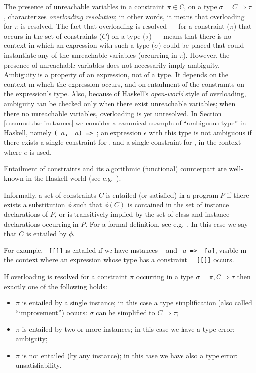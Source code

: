 The presence of unreachable variables in a constraint $\pi\in C$, on a
type $\sigma = C \Rightarrow \tau$, characterizes {\em overloading
  resolution\/}; in other words, it means that overloading for $\pi$
is resolved. The fact that overloading is resolved --- for a
constraint ($\pi$) that occurs in the set of constraints ($C$) on a
type ($\sigma$) --- means that there is no context in which an
expression with such a type ($\sigma$) could be placed that could
instantiate any of the unreachable variables (occurring in
$\pi$). However, the presence of unreachable variables does not
necessarily imply ambiguity. Ambiguity is a property of an expression,
not of a type. It depends on the context in which the expression
occurs, and on entailment of the constraints on the expression's type.
Also, because of Haskell's {\em open-world\/} style of overloading,
ambiguity can be checked only when there exist unreachable variables;
when there no unreachable variables, overloading is yet unresolved.
In Section \ref{sec:modular-instances} we consider a canonical example
of ``ambiguous type'' in Haskell, namely {\tt (\SShow\ $a$,
  \RRead\ $a$) => \String}; an expression $e$ with this type is not
ambiguous if there exists a single constraint for \SShow, and a single
constraint for \RRead, in the context where $e$ is used.

Entailment of constraints and its algorithmic (functional) counterpart
are well-known in the Haskell world (see
e.g.~\cite{MarkJones94a,TheoryOfOverloading,JBCS-Ambiguity-and-constrained-polymorphism}).

Informally, a set of constraints $C$ is entailed (or satisfied) in a
program $P$ if there exists a substitution $\phi$ such that $\phi(C)$
is contained in the set of instance declarations of $P$, or is
transitively implied by the set of class and instance declarations
occurring in $P$. For a formal definition, see
e.g.~\cite{MarkJones94a,JBCS-Ambiguity-and-constrained-polymorphism}. In
this case we say that $C$ is entailed by $\phi$.

For example, {\tt \Eq\ [[\Integer]]} is entailed if we have instances
{\tt \Eq\ \Integer} and {\tt \Eq\ $a$ => \Eq\ [$a$]}, visible in the
context where an expression whose type has a constraint {\tt
  \Eq\ [[\Integer]]} occurs.

If overloading is resolved for a constraint $\pi$ occurring in a type
$\sigma = \pi,C \Rightarrow \tau$ then exactly one of the following
holds:
\begin{itemize}

\item $\pi$ is entailed by a single instance; in this case a type
  simplification (also called ``improvement'') occurs: $\sigma$ can be
  simplified to $C \Rightarrow \tau$;

\item $\pi$ is entailed by two or more instances; in this case we have
  a type error: ambiguity;

\item $\pi$ is not entailed (by any instance); in this case we have also
  a type error: unsatisfiability.

\end{itemize}

